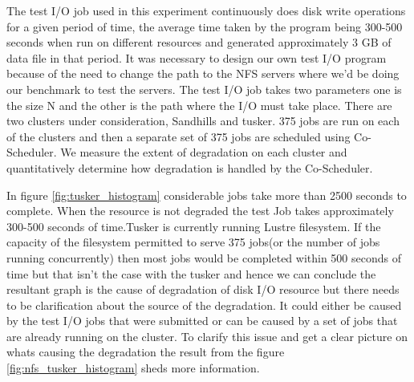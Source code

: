 \documentclass[ms,electronic,double]{nuthesis}
\begin{document}
The test I/O job used in this experiment continuously does disk write operations for a given period of time, the average
time taken by the program being 300-500 seconds when run on different resources and generated approximately 3 GB of data file
in that period. It was necessary to design our own test I/O program because of the need to change the path
to the NFS servers where we'd be doing our benchmark to test the servers. The test I/O job takes two parameters
one is the size N and the other is the path where the I/O must take place. There are two 
clusters under consideration, Sandhills and tusker. 375 jobs are run on each of 
the clusters and then a separate set of 375 jobs are scheduled using 
Co-Scheduler. We measure the extent of degradation on each cluster and quantitatively 
determine how degradation is handled by the Co-Scheduler.

In figure \ref{fig:tusker_histogram}  considerable jobs take more than 2500 seconds to complete. 
When the resource is not degraded the test Job takes approximately 300-500 seconds of time.Tusker is 
currently running Lustre filesystem. If the capacity of the filesystem permitted 
to serve 375 jobs(or the number of jobs running concurrently) then most jobs 
would be completed within 500 seconds of time but that isn't the case with the 
tusker and hence we can conclude the resultant graph is the cause of degradation 
of disk I/O resource but there needs to be clarification about the source of the degradation. 
It could either be caused by the test I/O jobs that were submitted or can be caused 
by a set of jobs that are already running on the cluster. To clarify this issue 
and get a clear picture on whats causing the degradation the result from the 
figure \ref{fig:nfs_tusker_histogram} sheds more information.
\end{document}
